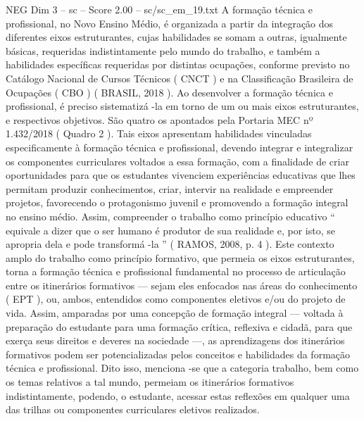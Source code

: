 \begin{textsample}{NEG Dim 3 – sc – Score 2.00 – sc/sc\_em\_19.txt}
A formação técnica e profissional, no Novo Ensino Médio, é organizada a partir da integração dos diferentes eixos estruturantes, cujas habilidades se somam a outras, igualmente básicas, requeridas indistintamente pelo mundo do trabalho, e também a habilidades específicas requeridas por distintas ocupações, conforme previsto no Catálogo Nacional de Cursos Técnicos ( CNCT ) e na Classificação Brasileira de Ocupações ( CBO ) ( BRASIL, 2018 ).
Ao desenvolver a formação técnica e profissional, é preciso sistematizá -la em torno de um ou mais eixos estruturantes, e respectivos objetivos.
São quatro os apontados pela Portaria MEC nº 1.432/2018 ( Quadro 2 ).
Tais eixos apresentam habilidades vinculadas especificamente à formação técnica e profissional, devendo integrar e integralizar os componentes curriculares voltados a essa formação, com a finalidade de criar oportunidades para que os estudantes vivenciem experiências educativas que lhes permitam produzir conhecimentos, criar, intervir na realidade e empreender projetos, favorecendo o protagonismo juvenil e promovendo a formação integral no ensino médio.
Assim, compreender o trabalho como princípio educativo “ equivale a dizer que o ser humano é produtor de sua realidade e, por isto, se apropria dela e pode transformá -la ” ( RAMOS, 2008, p. 4 ).
Este contexto amplo do trabalho como princípio formativo, que permeia os eixos estruturantes, torna a formação técnica e profissional fundamental no processo de articulação entre os itinerários formativos — sejam eles enfocados nas áreas do conhecimento ( EPT ), ou, ambos, entendidos como componentes eletivos e/ou do projeto de vida.
Assim, amparadas por uma concepção de formação integral — voltada à preparação do estudante para uma formação crítica, reflexiva e cidadã, para que exerça seus direitos e deveres na sociedade —, as aprendizagens dos itinerários formativos podem ser potencializadas pelos conceitos e habilidades da formação técnica e profissional.
Dito isso, menciona -se que a categoria trabalho, bem como os temas relativos a tal mundo, permeiam os itinerários formativos indistintamente, podendo, o estudante, acessar estas reflexões em qualquer uma das trilhas ou componentes curriculares eletivos realizados.

\end{textsample}
